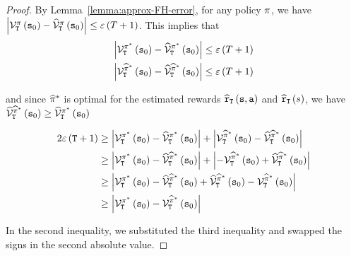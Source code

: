 \begin{proof}
By Lemma~\ref{lemma:approx-FH-error}, for any policy $\pi$, we have $\left|\mathcal{V}_{\tt T}^{\pi}\left({\tt s}_{0}\right)-\widehat{\mathcal{V}}_{\tt T}^{\pi}\left({\tt s}_{0}\right)\right|\leq\varepsilon\left(T+1\right)$.
This implies that
\begin{align*}
	\left|\mathcal{V}_{\tt T}^{\pi^{*}}\left({\tt s}_{0}\right)-\widehat{\mathcal{V}}_{\tt T}^{\pi^{*}}\left({\tt s}_{0}\right)\right| & \leq\varepsilon\left(T+1\right)\\
	\left|\mathcal{V}_{\tt T}^{\widehat{\pi}^{*}}\left({\tt s}_{0}\right)-\widehat{\mathcal{V}}_{\tt T}^{\widehat{\pi}^{*}}\left({\tt s}_{0}\right)\right| & \leq\varepsilon\left(T+1\right)
\end{align*}

and since $\widehat{\pi}^{*}$ is optimal for the estimated rewards
$\widehat{{\tt r}}_{\tt T}\left({\tt s},{\tt a}\right)$ and $\widehat{{\tt r}}_{\tt T}\left(s\right)$, we
have $\widehat{\mathcal{V}}_{\tt T}^{\widehat{\pi}^{*}}\left({\tt s}_{0}\right)\geq\widehat{\mathcal{V}}_{\tt T}^{\pi^{*}}\left({\tt s}_{0}\right)$

\begin{align*}
2\varepsilon\left({\tt T}+1\right) & \geq\left|\mathcal{V}_{\tt T}^{\pi^{*}}\left({\tt s}_{0}\right)-\widehat{\mathcal{V}}_{\tt T}^{\pi^{*}}\left({\tt s}_{0}\right)\right|+\left|\mathcal{V}_{\tt T}^{\widehat{\pi}^{*}}\left({\tt s}_{0}\right)-\widehat{\mathcal{V}}_{\tt T}^{\widehat{\pi}^{*}}\left({\tt s}_{0}\right)\right|\\
& \geq\left|\mathcal{V}_{\tt T}^{\pi^{*}}\left({\tt s}_{0}\right)-\widehat{\mathcal{V}}_{\tt T}^{\widehat{\pi}^{*}}\left({\tt s}_{0}\right)\right|+\left|-\mathcal{V}_{\tt T}^{\widehat{\pi}^{*}}\left({\tt s}_{0}\right)+\widehat{\mathcal{V}}_{\tt T}^{\widehat{\pi}^{*}}\left({\tt s}_{0}\right)\right|\\
& \geq\left|\mathcal{V}_{\tt T}^{\pi^{*}}\left({\tt s}_{0}\right)-{\widehat{\mathcal{V}}_{\tt T}^{\widehat{\pi}^{*}}\left({\tt s}_{0}\right)}+{\widehat{\mathcal{V}}_{\tt T}^{\widehat{\pi}^{*}}\left({\tt s}_{0}\right)}-\mathcal{V}_{\tt T}^{\widehat{\pi}^{*}}\left({\tt s}_{0}\right)\right|\\
& \geq\left|\mathcal{V}_{\tt T}^{\pi^{*}}\left({\tt s}_{0}\right)-\mathcal{V}_{\tt T}^{\widehat{\pi}^{*}}\left({\tt s}_{0}\right)\right|
\end{align*}

In the second inequality, we substituted the third inequality
and swapped the signs in the second absolute value. 
\end{proof}

